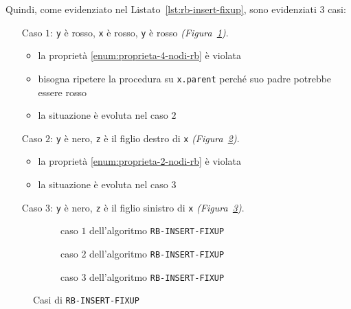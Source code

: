 \documentclass[italian, 10pt]{article}
\begin{document}
Quindi, come evidenziato nel Listato~\ref{lst:rb-insert-fixup}, sono evidenziati \(3\) casi:

\begin{itemize}
  \item[Caso \(1\):] \texttt{y} è rosso, \texttt{x} è rosso, \texttt{y} è rosso \textit{(Figura~\ref{fig:caso-1-algoritmo-rb-insert-fixup})}.
    \begin{itemize}
      \item la proprietà \ref{enum:proprieta-4-nodi-rb} è violata
      \item bisogna ripetere la procedura su \texttt{x.parent} perché suo padre potrebbe essere rosso
      \item la situazione è evoluta nel caso \(2\)
    \end{itemize}
  \item[Caso \(2\):] \texttt{y} è nero, \texttt{z} è il figlio destro di \texttt{x} \textit{(Figura~\ref{fig:caso-2-algoritmo-rb-insert-fixup})}.
    \begin{itemize}
      \item la proprietà \ref{enum:proprieta-2-nodi-rb} è violata
      \item la situazione è evoluta nel caso \(3\)
    \end{itemize}
  \item[Caso \(3\):] \texttt{y} è nero, \texttt{z} è il figlio sinistro di \texttt{x} \textit{(Figura~\ref{fig:caso-3-algoritmo-rb-insert-fixup})}.
\end{itemize}

\begin{figure}[htbp]
  \begin{subfigure}{\textwidth}
    \centering
    \bigskip
    \caption{caso \(1\) dell'algoritmo \texttt{RB-INSERT-FIXUP}}
    \label{fig:caso-1-algoritmo-rb-insert-fixup}
    \bigskip
  \end{subfigure}
  \begin{subfigure}{\textwidth}
    \centering
    \bigskip
    \caption{caso \(2\) dell'algoritmo \texttt{RB-INSERT-FIXUP}}
    \label{fig:caso-2-algoritmo-rb-insert-fixup}
    \bigskip
  \end{subfigure}
  \begin{subfigure}{\textwidth}
    \centering
    \bigskip
    \caption{caso \(3\) dell'algoritmo \texttt{RB-INSERT-FIXUP}}
    \label{fig:caso-3-algoritmo-rb-insert-fixup}
    \bigskip
  \end{subfigure}
  \caption{Casi di \texttt{RB-INSERT-FIXUP}}
  \label{fig:casi-algoritmo-rb-insert-fixup}
\end{figure}
\end{document}
